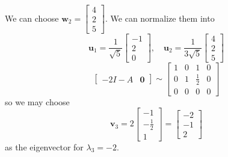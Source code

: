 \documentclass{beamer}
\theoremstyle{definition}
\theoremstyle{remark}
\begin{document}
\begin{frame}[t]
\begin{example}
We can choose $\mathbf w_2=\begin{bmatrix}
4\\2\\5
\end{bmatrix}$\pause. We can normalize them into
\[
\mathbf u_1=\frac{1}{\sqrt5}\begin{bmatrix}
-1\\2\\0
\end{bmatrix},\quad\mathbf u_2=\frac{1}{3\sqrt5}\begin{bmatrix}
4\\2\\5
\end{bmatrix}
\]
\[
\left[\begin{array}{c|c}
-2I-A&\mathbf0
\end{array}\right]\sim\left[\begin{array}{ccc|c}
1&0&1&0\\
0&1&\frac{1}{2}&0\\
0&0&0&0
\end{array}\right]
\]\pause
so we may choose
\[
\mathbf v_3=2\begin{bmatrix}
-1\\-\frac{1}{2}\\1
\end{bmatrix}=\begin{bmatrix}
-2\\-1\\2
\end{bmatrix}
\]
as the eigenvector for $\lambda_3=-2$.
\end{example}
\end{frame}
\end{document}
